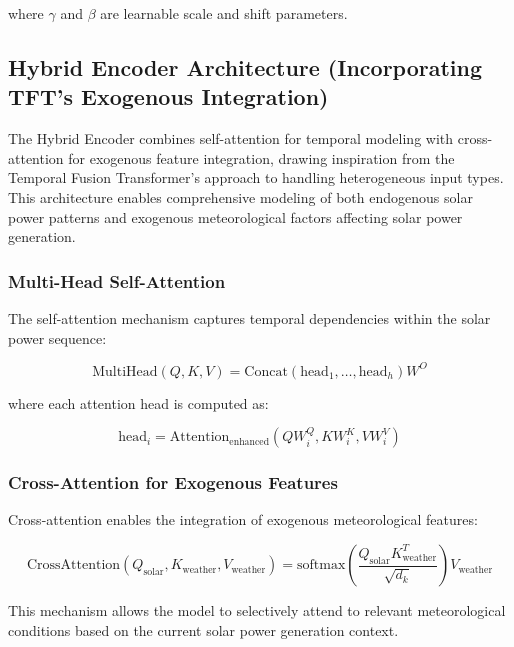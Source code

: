 \documentclass[12pt]{uomthesis}
\begin{document}
where $\gamma$ and $\beta$ are learnable scale and shift parameters.

\subsection{Hybrid Encoder Architecture (Incorporating TFT's Exogenous Integration)}

The Hybrid Encoder combines self-attention for temporal modeling with cross-attention for exogenous feature integration, drawing inspiration from the Temporal Fusion Transformer's \cite{lim2021temporal} approach to handling heterogeneous input types. This architecture enables comprehensive modeling of both endogenous solar power patterns and exogenous meteorological factors affecting solar power generation.

\subsubsection{Multi-Head Self-Attention}

The self-attention mechanism captures temporal dependencies within the solar power sequence:

\begin{equation}
\text{MultiHead}(Q, K, V) = \text{Concat}(\text{head}_1, \ldots, \text{head}_h)W^O
\end{equation}

where each attention head is computed as:

\begin{equation}
\text{head}_i = \text{Attention}_{\text{enhanced}}(QW_i^Q, KW_i^K, VW_i^V)
\end{equation}

\subsubsection{Cross-Attention for Exogenous Features}

Cross-attention enables the integration of exogenous meteorological features:

\begin{equation}
\text{CrossAttention}(Q_{\text{solar}}, K_{\text{weather}}, V_{\text{weather}}) = \text{softmax}\left(\frac{Q_{\text{solar}}K_{\text{weather}}^T}{\sqrt{d_k}}\right)V_{\text{weather}}
\end{equation}

This mechanism allows the model to selectively attend to relevant meteorological conditions based on the current solar power generation context.
\end{document}
